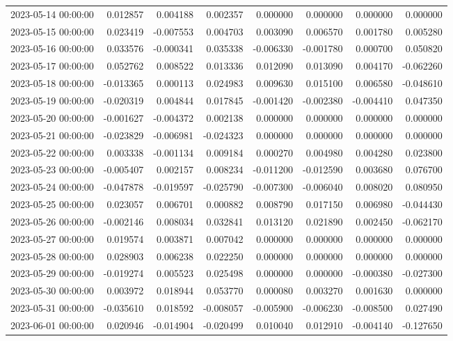 \begin{tabular}{lrrrrrrr}
2023-05-14 00:00:00 & 0.012857 & 0.004188 & 0.002357 & 0.000000 & 0.000000 & 0.000000 & 0.000000 \\
2023-05-15 00:00:00 & 0.023419 & -0.007553 & 0.004703 & 0.003090 & 0.006570 & 0.001780 & 0.005280 \\
2023-05-16 00:00:00 & 0.033576 & -0.000341 & 0.035338 & -0.006330 & -0.001780 & 0.000700 & 0.050820 \\
2023-05-17 00:00:00 & 0.052762 & 0.008522 & 0.013336 & 0.012090 & 0.013090 & 0.004170 & -0.062260 \\
2023-05-18 00:00:00 & -0.013365 & 0.000113 & 0.024983 & 0.009630 & 0.015100 & 0.006580 & -0.048610 \\
2023-05-19 00:00:00 & -0.020319 & 0.004844 & 0.017845 & -0.001420 & -0.002380 & -0.004410 & 0.047350 \\
2023-05-20 00:00:00 & -0.001627 & -0.004372 & 0.002138 & 0.000000 & 0.000000 & 0.000000 & 0.000000 \\
2023-05-21 00:00:00 & -0.023829 & -0.006981 & -0.024323 & 0.000000 & 0.000000 & 0.000000 & 0.000000 \\
2023-05-22 00:00:00 & 0.003338 & -0.001134 & 0.009184 & 0.000270 & 0.004980 & 0.004280 & 0.023800 \\
2023-05-23 00:00:00 & -0.005407 & 0.002157 & 0.008234 & -0.011200 & -0.012590 & 0.003680 & 0.076700 \\
2023-05-24 00:00:00 & -0.047878 & -0.019597 & -0.025790 & -0.007300 & -0.006040 & 0.008020 & 0.080950 \\
2023-05-25 00:00:00 & 0.023057 & 0.006701 & 0.000882 & 0.008790 & 0.017150 & 0.006980 & -0.044430 \\
2023-05-26 00:00:00 & -0.002146 & 0.008034 & 0.032841 & 0.013120 & 0.021890 & 0.002450 & -0.062170 \\
2023-05-27 00:00:00 & 0.019574 & 0.003871 & 0.007042 & 0.000000 & 0.000000 & 0.000000 & 0.000000 \\
2023-05-28 00:00:00 & 0.028903 & 0.006238 & 0.022250 & 0.000000 & 0.000000 & 0.000000 & 0.000000 \\
2023-05-29 00:00:00 & -0.019274 & 0.005523 & 0.025498 & 0.000000 & 0.000000 & -0.000380 & -0.027300 \\
2023-05-30 00:00:00 & 0.003972 & 0.018944 & 0.053770 & 0.000080 & 0.003270 & 0.001630 & 0.000000 \\
2023-05-31 00:00:00 & -0.035610 & 0.018592 & -0.008057 & -0.005900 & -0.006230 & -0.008500 & 0.027490 \\
2023-06-01 00:00:00 & 0.020946 & -0.014904 & -0.020499 & 0.010040 & 0.012910 & -0.004140 & -0.127650 \\

\end{tabular}
